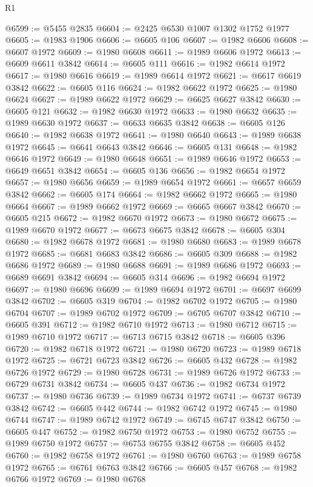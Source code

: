 \begin{lexlean}{R1}
\begin{coremodule}
@6599 := @5455 @2835
@6604 := @2425 @6530 @1007 @1302 @1752 @1977
@6605 := @1983 @1906
@6606 := @6605 @106
@6607 := @1982 @6606
@6608 := @6607 @1972
@6609 := @1980 @6608
@6611 := @1989 @6606 @1972
@6613 := @6609 @6611 @3842
@6614 := @6605 @111
@6616 := @1982 @6614 @1972
@6617 := @1980 @6616
@6619 := @1989 @6614 @1972
@6621 := @6617 @6619 @3842
@6622 := @6605 @116
@6624 := @1982 @6622 @1972
@6625 := @1980 @6624
@6627 := @1989 @6622 @1972
@6629 := @6625 @6627 @3842
@6630 := @6605 @121
@6632 := @1982 @6630 @1972
@6633 := @1980 @6632
@6635 := @1989 @6630 @1972
@6637 := @6633 @6635 @3842
@6638 := @6605 @126
@6640 := @1982 @6638 @1972
@6641 := @1980 @6640
@6643 := @1989 @6638 @1972
@6645 := @6641 @6643 @3842
@6646 := @6605 @131
@6648 := @1982 @6646 @1972
@6649 := @1980 @6648
@6651 := @1989 @6646 @1972
@6653 := @6649 @6651 @3842
@6654 := @6605 @136
@6656 := @1982 @6654 @1972
@6657 := @1980 @6656
@6659 := @1989 @6654 @1972
@6661 := @6657 @6659 @3842
@6662 := @6605 @174
@6664 := @1982 @6662 @1972
@6665 := @1980 @6664
@6667 := @1989 @6662 @1972
@6669 := @6665 @6667 @3842
@6670 := @6605 @215
@6672 := @1982 @6670 @1972
@6673 := @1980 @6672
@6675 := @1989 @6670 @1972
@6677 := @6673 @6675 @3842
@6678 := @6605 @304
@6680 := @1982 @6678 @1972
@6681 := @1980 @6680
@6683 := @1989 @6678 @1972
@6685 := @6681 @6683 @3842
@6686 := @6605 @309
@6688 := @1982 @6686 @1972
@6689 := @1980 @6688
@6691 := @1989 @6686 @1972
@6693 := @6689 @6691 @3842
@6694 := @6605 @314
@6696 := @1982 @6694 @1972
@6697 := @1980 @6696
@6699 := @1989 @6694 @1972
@6701 := @6697 @6699 @3842
@6702 := @6605 @319
@6704 := @1982 @6702 @1972
@6705 := @1980 @6704
@6707 := @1989 @6702 @1972
@6709 := @6705 @6707 @3842
@6710 := @6605 @391
@6712 := @1982 @6710 @1972
@6713 := @1980 @6712
@6715 := @1989 @6710 @1972
@6717 := @6713 @6715 @3842
@6718 := @6605 @396
@6720 := @1982 @6718 @1972
@6721 := @1980 @6720
@6723 := @1989 @6718 @1972
@6725 := @6721 @6723 @3842
@6726 := @6605 @432
@6728 := @1982 @6726 @1972
@6729 := @1980 @6728
@6731 := @1989 @6726 @1972
@6733 := @6729 @6731 @3842
@6734 := @6605 @437
@6736 := @1982 @6734 @1972
@6737 := @1980 @6736
@6739 := @1989 @6734 @1972
@6741 := @6737 @6739 @3842
@6742 := @6605 @442
@6744 := @1982 @6742 @1972
@6745 := @1980 @6744
@6747 := @1989 @6742 @1972
@6749 := @6745 @6747 @3842
@6750 := @6605 @447
@6752 := @1982 @6750 @1972
@6753 := @1980 @6752
@6755 := @1989 @6750 @1972
@6757 := @6753 @6755 @3842
@6758 := @6605 @452
@6760 := @1982 @6758 @1972
@6761 := @1980 @6760
@6763 := @1989 @6758 @1972
@6765 := @6761 @6763 @3842
@6766 := @6605 @457
@6768 := @1982 @6766 @1972
@6769 := @1980 @6768

\end{coremodule}
\end{lexlean}
